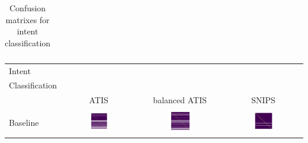 \documentclass[a4paper]{article}
\begin{document}
\begin{table}[h]
\begin{adjustbox}{max width=\textwidth}
\begin{tabular}{l|ccc}
		\end{tabular}
	\end{adjustbox}
\caption{Confusion matrixes for intent classification}
\label{fig:cm_intent}
\end{table}
\begin{table}[h]
	\centering
	\begin{adjustbox}{max width=\textwidth}
		\begin{tabular}{l|ccc}
			Intent & & & \\
			Classification & & & \\
			& ATIS & balanced ATIS & SNIPS \\
			\cmidrule{1-4}
			Baseline &  \includegraphics[width=0.3\textwidth]{../assets/CM_baseline_slot_ATIS_labeless} & \includegraphics[width=0.3\textwidth]{../assets/CM_baseline_slot_remix_ATIS_labeless} &\includegraphics[width=0.3\textwidth]{../assets/CM_baseline_slot_SNIPS_labeless} \\
			\cmidrule{1-4}

\end{tabular}
\end{adjustbox}
\end{table}
\end{document}

